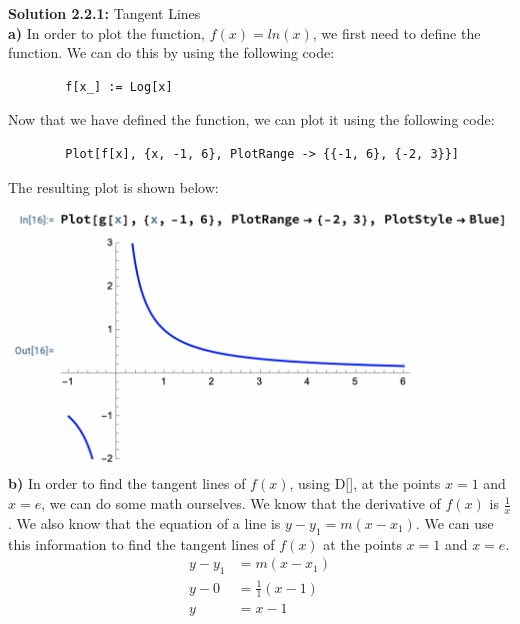\documentclass{article}
\begin{document}
    \vfill
    \newpage

    \headheight=10pt
    \textbf{Solution 2.2.1:} Tangent Lines \\
    \textbf{a)} In order to plot the function, $f(x) = ln(x)$, we first need to define the function. We can do this by using the following code: \\
    \begin{verbatim}
        f[x_] := Log[x]
    \end{verbatim}
    Now that we have defined the function, we can plot it using the following code: \\
    \begin{verbatim}
        Plot[f[x], {x, -1, 6}, PlotRange -> {{-1, 6}, {-2, 3}}]
    \end{verbatim}
    The resulting plot is shown below: \\
    \includegraphics[scale=0.5]{2.2.1a.png} \\

    \textbf{b)} In order to find the tangent lines of $f(x)$, using D[], at the points $x = 1$ and $x = e$, we can do some math ourselves. We know that the derivative of $f(x)$ is $\frac{1}{x}$. We also know that the equation of a line is $y-y_1 = m(x-x_1)$. We can use this information to find the tangent lines of $f(x)$ at the points $x = 1$ and $x = e$. \\

    \begin{equation*}
        \begin{split}
            y-y_1 &= m(x-x_1) \\
            y-0 &= \frac{1}{1}(x-1) \\
            y &= x-1
        \end{split}
    \end{equation*}
\end{document}
